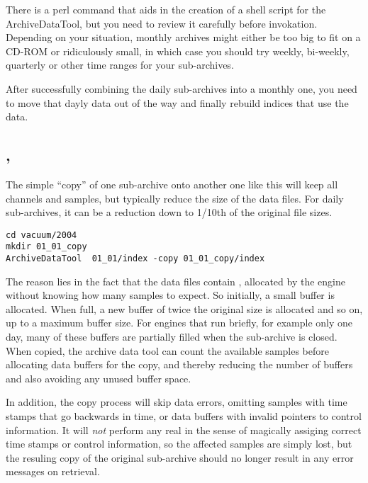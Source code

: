 There is a perl command  that aids in the
creation of a shell script for the ArchiveDataTool, but you need to
review it carefully before invokation.
Depending on your situation, monthly archives might either
be too big to fit on a CD-ROM or ridiculously small, in which case you
should try weekly, bi-weekly, quarterly or other time ranges for your sub-archives.

After successfully combining the daily sub-archives into a monthly one,
you need to move that dayly data out of the way and finally
rebuild indices that use the data.

\subsection{, }
The simple ``copy'' of one sub-archive onto another one like this will
keep all channels and samples, but typically reduce the size of the
data files.  For daily sub-archives, it can be a reduction down to
1/10th of the original file sizes.

\begin{lstlisting}[frame=none,keywordstyle=\sffamily]
cd vacuum/2004
mkdir 01_01_copy
ArchiveDataTool  01_01/index -copy 01_01_copy/index
\end{lstlisting}

\noindent The reason lies in the fact that the data files contain
, allocated by the engine without knowing how many
samples to expect. So initially, a small buffer is allocated. When
full, a new buffer of twice the original size is allocated and so on,
up to a maximum buffer size. For engines that run briefly, for example
only one day, many of these buffers are partially filled when the
sub-archive is closed.  When copied, the archive data tool can count
the available samples before allocating data buffers for the copy, and
thereby reducing the number of buffers and also avoiding any unused
buffer space.

In addition, the copy process will skip data errors, omitting samples
with time stamps that go backwards in time,
or data buffers with invalid pointers to control information.
It will \emph{not} perform any real  in the sense
of magically assiging correct time stamps or control information, so
the affected samples are simply lost, but the resuling copy of the
original sub-archive should no longer result in any error messages on retrieval.

